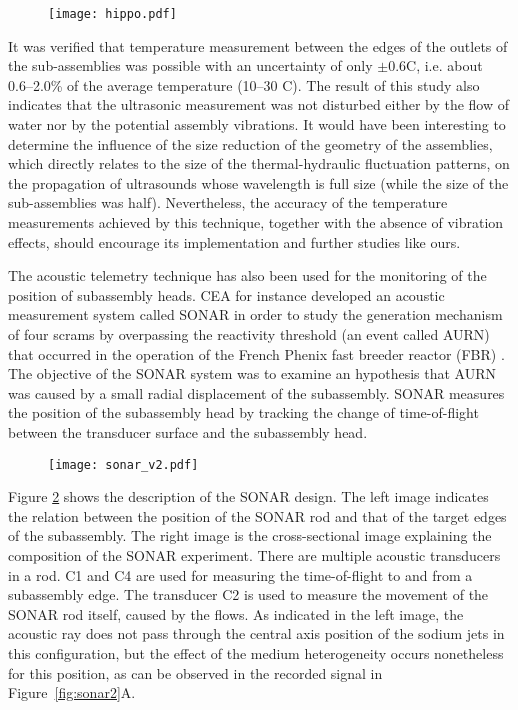     \begin{figure}[htbp]
        \centerline{\texttt{[image: hippo.pdf]}}
        \label{fig:hippo}
    \end{figure}
%
    It was verified that temperature measurement between the edges of the outlets of the sub-assemblies was possible with an uncertainty of only
$\pm$\num{0.6}\textdegree{}C, i.e. about \numrange{0.6}{2.0}\% of the average temperature (\numrange{10}{30} \textdegree{}C).
The result of this study \parencite{Taylor1992Subassemblyoutlettemperature} also indicates that
the ultrasonic measurement was not disturbed either by the flow of water nor by the potential assembly vibrations. It would have been interesting to determine
the influence of the size reduction of the geometry of the assemblies, which directly relates to the size of the thermal-hydraulic fluctuation patterns, on the
propagation of ultrasounds whose wavelength is full size (while the size of the sub-assemblies was half). Nevertheless, the accuracy of the temperature
measurements achieved by this technique, together with the absence of vibration effects, should encourage its implementation and further studies like ours.

The acoustic telemetry technique has also been used for the monitoring of the position of subassembly heads.
CEA for instance developed an acoustic measurement system called SONAR in order to study the generation mechanism of
four scrams by overpassing the reactivity threshold (an event called AURN) that occurred in the operation
of the French Phenix fast breeder reactor (FBR) \parencite{Berton1996Continuousmonitoringof}.
The objective of the SONAR system was to examine an hypothesis that AURN was caused by a small radial displacement of the subassembly.
SONAR measures the position of the subassembly head by tracking the change of time-of-flight
between the transducer surface and the subassembly head.

\begin{figure}[htbp]
    \centerline{\texttt{[image: sonar\_v2.pdf]}}
    \label{fig:sonar}
\end{figure}

Figure \ref{fig:sonar} shows the description of the SONAR design.
The left image indicates the relation between the position of the SONAR rod and that of the target edges of the subassembly.
The right image is the cross-sectional image explaining the composition of the SONAR experiment.
There are multiple acoustic transducers in a rod.
C1 and C4 are used for measuring the time-of-flight to and from a subassembly edge.
The transducer C2 is used to measure the movement of the SONAR rod itself, caused by the flows.
As indicated in the left image, the acoustic ray does not pass through the central axis position of the sodium jets in this configuration,
but the effect of the medium heterogeneity occurs nonetheless for this position, as can be observed in the recorded signal in Figure~\ref{fig:sonar2}A.

